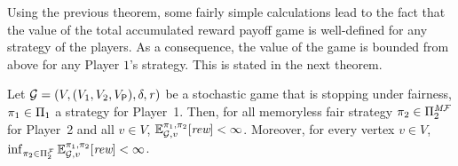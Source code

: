 



Using the previous theorem, some fairly simple calculations lead to
the fact that the value of the total accumulated reward payoff game is
well-defined for any strategy of the players.
%
As a consequence, the value of the game is bounded
from above for any Player $1$'s strategy.
%
This is stated in the next theorem.

\begin{theorem}\label{th:memoryless-strat-p2-bounded-expectation}
  Let $\mathcal{G}= (V, (V_1, V_2, V_{\mathsf{P}}), \delta, \mathit{r})$ be a
  stochastic game  that is stopping under fairness,
  $\pi_{1} \in \Pi_{1}$ a strategy for Player~1.
  Then, for all memoryless fair strategy
  $\pi_{2} \in \Pi^{\textit{M}\mathcal{F}}_{2}$ for Player~2
  and all $v \in V$,
  $\mathbb{E}^{\pi_{1}, \pi_{2}}_{\mathcal{G},v}[\textit{rew}] < \infty$.
  Moreover, for every vertex $v \in V$,
  $\inf_{\pi_{2} \in \Pi^{\mathcal{F}}_{2}} \mathbb{E}^{\pi_{1}, \pi_{2}}_{\mathcal{G},v}[\textit{rew}] < \infty$.
\end{theorem}



